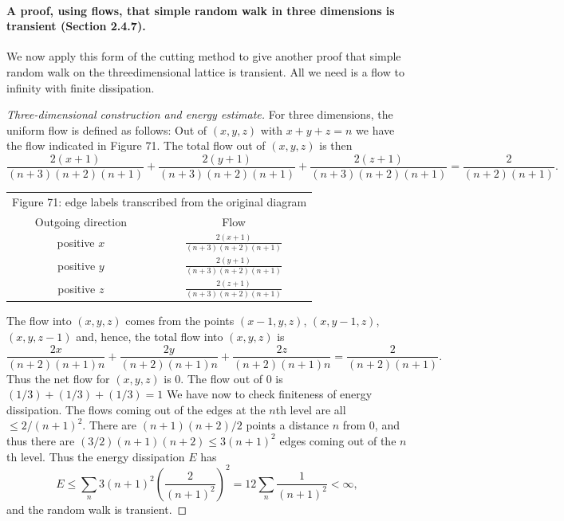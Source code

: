 \paragraph{A proof, using flows, that simple random walk in three dimensions is transient (Section 2.4.7).}
We now apply this form of the cutting method to give another proof that simple random walk on the threedimensional lattice is transient. All we need is a flow to infinity with finite dissipation.
\begin{proof}[Three-dimensional construction and energy estimate]
For three dimensions, the uniform flow is defined as follows: Out of $(x,y,z)$ with $x+y+z=n$ we have the flow indicated in Figure 71. The total flow out of $(x,y,z)$ is then
\[
\frac{2(x+1)}{(n+3)(n+2)(n+1)}+
\frac{2(y+1)}{(n+3)(n+2)(n+1)}+
\frac{2(z+1)}{(n+3)(n+2)(n+1)}
=\frac2{(n+2)(n+1)}.
\]
\begin{center}
\begin{tabular}{c|c}
\multicolumn{2}{c}{Figure 71: edge labels transcribed from the original diagram}\\
Outgoing direction & Flow \\\hline
positive $x$ & $\displaystyle\frac{2(x+1)}{(n+3)(n+2)(n+1)}$\\[7pt]
positive $y$ & $\displaystyle\frac{2(y+1)}{(n+3)(n+2)(n+1)}$\\[7pt]
positive $z$ & $\displaystyle\frac{2(z+1)}{(n+3)(n+2)(n+1)}$
\end{tabular}
\end{center}
The flow into $(x,y,z)$ comes from the points $(x-1,y,z)$, $(x,y-1,z)$, $(x,y,z-1)$ and, hence, the total flow into $(x,y,z)$ is
\[
\frac{2x}{(n+2)(n+1)n}+
\frac{2y}{(n+2)(n+1)n}+
\frac{2z}{(n+2)(n+1)n}
=\frac2{(n+2)(n+1)}.
\]
Thus the net flow for $(x,y,z)$ is $0$. The flow out of $0$ is $(1/3)+(1/3)+(1/3)=1$ We have now to check finiteness of energy dissipation. The flows coming out of the edges at the $n$th level are all $\le2/(n+1)^2$. There are $(n+1)(n+2)/2$ points a distance $n$ from $0$, and thus there are $(3/2)(n+1)(n+2)\le3(n+1)^2$ edges coming out of the $n$th level. Thus the energy dissipation $E$ has
\[
E\le\sum_n3(n+1)^2\left(\frac2{(n+1)^2}\right)^2
=12\sum_n\frac1{(n+1)^2}<\infty,
\]
and the random walk is transient.
\end{proof}
